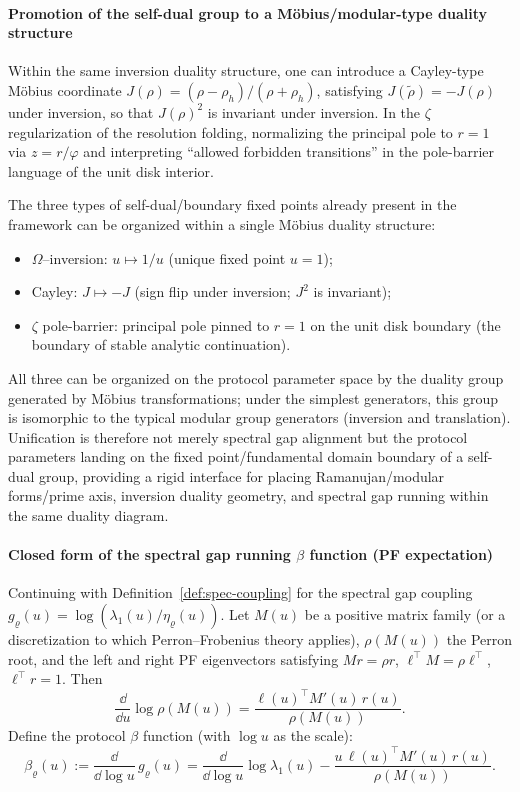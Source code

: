 \paragraph{Promotion of the self-dual group to a M\"obius/modular-type duality structure}
Within the same inversion duality structure, one can introduce a Cayley-type M\"obius coordinate
\(
J(\rho)=(\rho-\rho_h)/(\rho+\rho_h)
\),
satisfying \(J(\tilde\rho)=-J(\rho)\) under inversion, so that \(J(\rho)^2\) is invariant under inversion.
In the \(\zeta\) regularization of the resolution folding, normalizing the principal pole to \(r=1\) via \(z=r/\varphi\) and interpreting ``allowed forbidden transitions'' in the pole-barrier language of the unit disk interior.

\begin{proposition}\label{prop:mobius-duality-unified}
The three types of self-dual/boundary fixed points already present in the framework can be organized within a single M\"obius duality structure:
\begin{itemize}
  \item \(\Omega\)--inversion: \(u\mapsto 1/u\) (unique fixed point \(u=1\));
  \item Cayley: \(J\mapsto -J\) (sign flip under inversion; \(J^2\) is invariant);
  \item \(\zeta\) pole-barrier: principal pole pinned to \(r=1\) on the unit disk boundary (the boundary of stable analytic continuation).
\end{itemize}
All three can be organized on the protocol parameter space by the duality group generated by M\"obius transformations; under the simplest generators, this group is isomorphic to the typical modular group generators (inversion and translation). Unification is therefore not merely spectral gap alignment but the protocol parameters landing on the fixed point/fundamental domain boundary of a self-dual group, providing a rigid interface for placing Ramanujan/modular forms/prime axis, inversion duality geometry, and spectral gap running within the same duality diagram.
\end{proposition}

\paragraph{Closed form of the spectral gap running \(\beta\) function (PF expectation)}
Continuing with Definition~\ref{def:spec-coupling} for the spectral gap coupling \(g_{\varrho}(u)=\log(\lambda_1(u)/\eta_{\varrho}(u))\). Let \(M(u)\) be a positive matrix family (or a discretization to which Perron--Frobenius theory applies), \(\rho(M(u))\) the Perron root, and the left and right PF eigenvectors satisfying \(M r=\rho r\), \(\ell^\top M=\rho \ell^\top\), \(\ell^\top r=1\). Then
\[
\frac{\dd}{\dd u}\log\rho(M(u))
=\frac{\ell(u)^\top M'(u)\,r(u)}{\rho(M(u))}.
\]
Define the protocol \(\beta\) function (with \(\log u\) as the scale):
\[
\beta_\varrho(u)
:=\frac{\dd}{\dd\log u}\,g_\varrho(u)
=\frac{\dd}{\dd\log u}\log\lambda_1(u)
-\frac{u\,\ell(u)^\top M'(u)\,r(u)}{\rho(M(u))}.
\]

